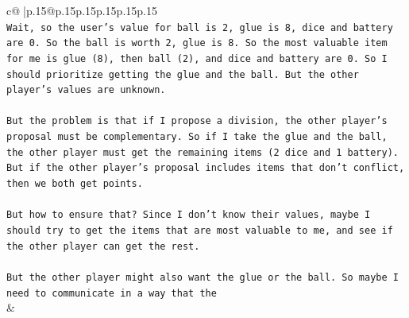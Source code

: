 \documentclass{article}
\begin{document}
{\begin{supertabular}{c@{$\;$}|p{.15\linewidth}@{}p{.15\linewidth}p{.15\linewidth}p{.15\linewidth}p{.15\linewidth}p{.15\linewidth}}
{{{\\ 
\texttt{Wait, so the user's value for ball is 2, glue is 8, dice and battery are 0. So the ball is worth 2, glue is 8. So the most valuable item for me is glue (8), then ball (2), and dice and battery are 0. So I should prioritize getting the glue and the ball. But the other player's values are unknown.} \\
\\ 
\texttt{But the problem is that if I propose a division, the other player's proposal must be complementary. So if I take the glue and the ball, the other player must get the remaining items (2 dice and 1 battery). But if the other player's proposal includes items that don't conflict, then we both get points.} \\
\\ 
\texttt{But how to ensure that? Since I don't know their values, maybe I should try to get the items that are most valuable to me, and see if the other player can get the rest.} \\
\\ 
\texttt{But the other player might also want the glue or the ball. So maybe I need to communicate in a way that the} \\
            }
        }
    }
    & \\ \\


\end{supertabular}}
\end{document}
